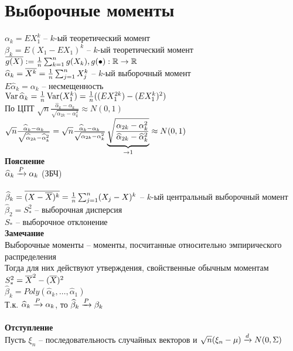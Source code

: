 \documentclass[12pt]{article}
\begin{document}
\section{Выборочные моменты}
$\alpha_k = E X_1^k$ -- $k$-ый теоретический момент\\
$\beta_k = E(X_1 - EX_1)^k$ -- $k$-ый теоретический момент\\
$\ol{g(X)} := \frac1n \sum_{k=1}^n g(X_k), g(\bullet): \Rset \rto \Rset$\\
$\widehat \alpha_k = \ol{X^k} = \frac1n \sum_{j=1}^n X^k_j$ -- $k$-ый выборочный момент\\
$E\widehat \alpha_k = \alpha_k$ -- несмещенность\\
$\Var \widehat \alpha_k = \frac1n \Var(X_1^k) = \frac1n ((EX_1^{2k}) - (EX_1^k)^2)$\\
По ЦПТ $\sqrt{n} \frac{\widehat \alpha_k - \alpha_k}{\sqrt{\alpha_{2k}-\alpha_k^2}} \approx N(0,1)$\\
$\sqrt{n} \frac{\widehat \alpha_k - \alpha_k}{\sqrt{\widehat \alpha_{2k}-\widehat\alpha_k^2}} = \sqrt{n} \frac{\widehat \alpha_k - \alpha_k}{\sqrt{\alpha_{2k}-\alpha_k^2}} \ub{\rto 1}{\sqrt{\frac{\alpha_{2k}-\alpha_k^2}{\widehat \alpha_{2k}-\widehat \alpha_k^2}}} \approx N(0,1)$\\
\textbf{Пояснение}\\
$\widehat \alpha_k \xrto{P} \alpha_k$ (ЗБЧ)\\\\
$\widehat \beta_k = \ol{(X-\ol X)^k} = \frac1n \sum_{j=1}^n (X_j - X)^k$ -- $k$-ый центральный выборочный момент\\
$\widehat \beta_2 = S_*^2$ -- выборочная дисперсия\\
$S_*$ -- выборочное отклонение\\
\textbf{Замечание}\\
Выборочные моменты -- моменты, посчитанные относительно эмпирического распределения\\
Тогда для них действуют утверждения, свойственные обычным моментам\\
$S_*^2 = \ol X^2 - (\ol X)^2$\\
$\widehat\beta_k = Poly(\widehat\alpha_k, \ldots, \widehat \alpha_1)$\\
Т.к. $\widehat \alpha_k \xrto{P} \alpha_k$, то $\widehat\beta_k \xrto{P} \beta_k$\\\\
\textbf{Отступление}\\
Пусть $\xi_n$ -- последовательность случайных векторов и $\sqrt{n}(\xi_n - \mu) \xrto{d} N(0, \Sigma)$\\
\end{document}
